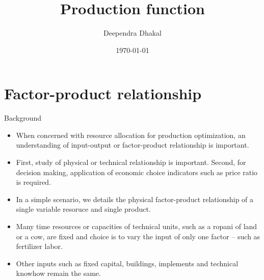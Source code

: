 \documentclass[12pt,ignorenonframetext,aspectratio=169]{beamer}
\title{\insertsectionhead}
  {
    \definecolor{white}{rgb}{0.776,0.357,0.157}
    \definecolor{iqss@orange}{rgb}{1,1,1}
    \ifnum \insertmainframenumber > \insertframenumber
    \frame{
      \frametitle{\iqsssectiontitleheader}
      \tableofcontents[currentsection]
    }
    \else
    \frame{
      \frametitle{Backup Slides}
      \tableofcontents[sectionstyle=shaded/shaded,subsectionstyle=shaded/shaded/shaded]
    }
    \fi
  }
\title[]{Production function}
\author[
        Deependra Dhakal
    ]{Deependra Dhakal}
\institute[
    ]{
    GAASC, Baitadi \and Tribhuwan University
    }
\date[
      \today
  ]{
      \today
        }
\providecommand{\tightlist}{%
  \setlength{\itemsep}{0pt}\setlength{\parskip}{0pt}}
\begin{document}
  \begin{frame}[plain]
  \titlepage
  \end{frame}



\hypertarget{factor-product-relationship}{%
\section{Factor-product
relationship}\label{factor-product-relationship}}

\begin{frame}{Background}
\protect\hypertarget{background}{}
\begin{itemize}
\tightlist
\item
  When concerned with resource allocation for production optimization,
  an understanding of input-output or factor-product relationship is
  important.
\item
  First, study of physical or technical relationship is important.
  Second, for decision making, application of economic choice indicators
  such as price ratio is required.
\item
  In a simple scenario, we details the physical factor-product
  relationship of a single variable resoruce and single product.
\item
  Many time resources or capacities of technical units, such as a ropani
  of land or a cow, are fixed and choice is to vary the input of only
  one factor -- such as fertilizer  labor.
\item
  Other inputs such as fixed capital, buildings, implements and
  technical knowhow remain the same.
\end{itemize}
\end{frame}
\end{document}
